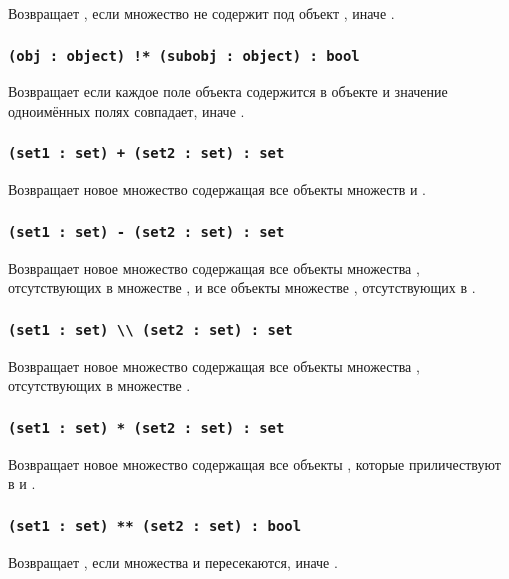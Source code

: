 Возвращает \true{}, если множество  не содержит под объект , иначе \false{}.

\subsubsection{\lstinline`(obj : object) !* (subobj : object) : bool`}

Возвращает \false{} если каждое поле объекта  содержится в объекте  и значение одноимённых полях совпадает, иначе \true{}.

\subsubsection{\lstinline`(set1 : set) + (set2 : set) : set`}

Возвращает новое множество содержащая все объекты множеств  и .

\subsubsection{\lstinline`(set1 : set) - (set2 : set) : set`}

Возвращает новое множество содержащая все объекты множества , отсутствующих в множестве , и все объекты множестве , отсутствующих в .

\subsubsection{\lstinline`(set1 : set) \\ (set2 : set) : set`}

Возвращает новое множество содержащая все объекты множества , отсутствующих в множестве .

\subsubsection{\lstinline`(set1 : set) * (set2 : set) : set`}

Возвращает новое множество содержащая все объекты , которые приличествуют в  и .

\subsubsection{\lstinline`(set1 : set) ** (set2 : set) : bool`}

Возвращает \true, если множества  и  пересекаются, иначе \false.

